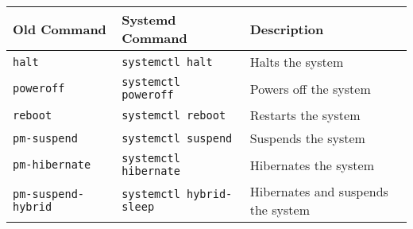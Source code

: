 \documentclass[a4paper]{article}
\begin{document}
\begin{center}
\vspace{6mm}

\begin{tabularx}{\textwidth}{ |X|X|X| }
\hline
\rowcolor[gray]{.8}
\bfseries Old Command & \bfseries Systemd Command  & \bfseries Description \\\hline
\tt halt              & \tt systemctl halt         & Halts the system \\\hline
\tt poweroff          & \tt systemctl poweroff     & Powers off the system \\\hline
\tt reboot            & \tt systemctl reboot       & Restarts the system \\\hline
\tt pm-suspend        & \tt systemctl suspend      & Suspends the system \\\hline
\tt pm-hibernate      & \tt systemctl hibernate    & Hibernates the system \\\hline
\tt pm-suspend-hybrid & \tt systemctl hybrid-sleep & Hibernates and suspends the system \\\hline
\end{tabularx}



\end{center}
\end{document}
